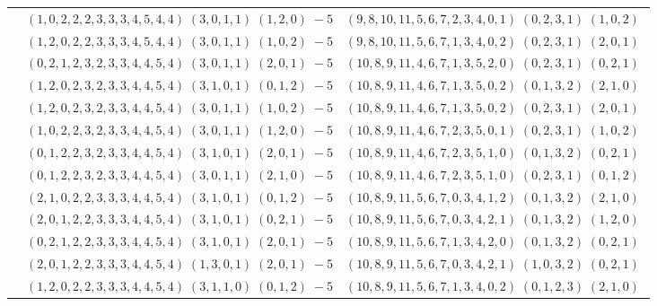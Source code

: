 \documentclass[11pt]{article}
\begin{document}
\begin{longtable}[l]{|c|c|c|}
 \cline{2-3} 
 & $(1 ,0 ,2 ,2 ,2 ,3 ,3 ,3 ,4 ,5 ,4 ,4) \;(3 ,0 ,1 ,1) \;(1 ,2 ,0) \;-5$ & $(9 ,8 ,10 ,11 ,5 ,6 ,7 ,2 ,3 ,4 ,0 ,1) \;(0 ,2 ,3 ,1) \;(1 ,0 ,2) \;$\\ 
 \cline{2-3} 
 & $(1 ,2 ,0 ,2 ,2 ,3 ,3 ,3 ,4 ,5 ,4 ,4) \;(3 ,0 ,1 ,1) \;(1 ,0 ,2) \;-5$ & $(9 ,8 ,10 ,11 ,5 ,6 ,7 ,1 ,3 ,4 ,0 ,2) \;(0 ,2 ,3 ,1) \;(2 ,0 ,1) \;$\\ 
 \cline{2-3} 
 & $(0 ,2 ,1 ,2 ,3 ,2 ,3 ,3 ,4 ,4 ,5 ,4) \;(3 ,0 ,1 ,1) \;(2 ,0 ,1) \;-5$ & $(10 ,8 ,9 ,11 ,4 ,6 ,7 ,1 ,3 ,5 ,2 ,0) \;(0 ,2 ,3 ,1) \;(0 ,2 ,1) \;$\\ 
 \cline{2-3} 
 & $(1 ,2 ,0 ,2 ,3 ,2 ,3 ,3 ,4 ,4 ,5 ,4) \;(3 ,1 ,0 ,1) \;(0 ,1 ,2) \;-5$ & $(10 ,8 ,9 ,11 ,4 ,6 ,7 ,1 ,3 ,5 ,0 ,2) \;(0 ,1 ,3 ,2) \;(2 ,1 ,0) \;$\\ 
 \cline{2-3} 
 & $(1 ,2 ,0 ,2 ,3 ,2 ,3 ,3 ,4 ,4 ,5 ,4) \;(3 ,0 ,1 ,1) \;(1 ,0 ,2) \;-5$ & $(10 ,8 ,9 ,11 ,4 ,6 ,7 ,1 ,3 ,5 ,0 ,2) \;(0 ,2 ,3 ,1) \;(2 ,0 ,1) \;$\\ 
 \cline{2-3} 
 & $(1 ,0 ,2 ,2 ,3 ,2 ,3 ,3 ,4 ,4 ,5 ,4) \;(3 ,0 ,1 ,1) \;(1 ,2 ,0) \;-5$ & $(10 ,8 ,9 ,11 ,4 ,6 ,7 ,2 ,3 ,5 ,0 ,1) \;(0 ,2 ,3 ,1) \;(1 ,0 ,2) \;$\\ 
 \cline{2-3} 
 & $(0 ,1 ,2 ,2 ,3 ,2 ,3 ,3 ,4 ,4 ,5 ,4) \;(3 ,1 ,0 ,1) \;(2 ,0 ,1) \;-5$ & $(10 ,8 ,9 ,11 ,4 ,6 ,7 ,2 ,3 ,5 ,1 ,0) \;(0 ,1 ,3 ,2) \;(0 ,2 ,1) \;$\\ 
 \cline{2-3} 
 & $(0 ,1 ,2 ,2 ,3 ,2 ,3 ,3 ,4 ,4 ,5 ,4) \;(3 ,0 ,1 ,1) \;(2 ,1 ,0) \;-5$ & $(10 ,8 ,9 ,11 ,4 ,6 ,7 ,2 ,3 ,5 ,1 ,0) \;(0 ,2 ,3 ,1) \;(0 ,1 ,2) \;$\\ 
 \cline{2-3} 
 & $(2 ,1 ,0 ,2 ,2 ,3 ,3 ,3 ,4 ,4 ,5 ,4) \;(3 ,1 ,0 ,1) \;(0 ,1 ,2) \;-5$ & $(10 ,8 ,9 ,11 ,5 ,6 ,7 ,0 ,3 ,4 ,1 ,2) \;(0 ,1 ,3 ,2) \;(2 ,1 ,0) \;$\\ 
 \cline{2-3} 
 & $(2 ,0 ,1 ,2 ,2 ,3 ,3 ,3 ,4 ,4 ,5 ,4) \;(3 ,1 ,0 ,1) \;(0 ,2 ,1) \;-5$ & $(10 ,8 ,9 ,11 ,5 ,6 ,7 ,0 ,3 ,4 ,2 ,1) \;(0 ,1 ,3 ,2) \;(1 ,2 ,0) \;$\\ 
 \cline{2-3} 
 & $(0 ,2 ,1 ,2 ,2 ,3 ,3 ,3 ,4 ,4 ,5 ,4) \;(3 ,1 ,0 ,1) \;(2 ,0 ,1) \;-5$ & $(10 ,8 ,9 ,11 ,5 ,6 ,7 ,1 ,3 ,4 ,2 ,0) \;(0 ,1 ,3 ,2) \;(0 ,2 ,1) \;$\\ 
 \cline{2-3} 
 & $(2 ,0 ,1 ,2 ,2 ,3 ,3 ,3 ,4 ,4 ,5 ,4) \;(1 ,3 ,0 ,1) \;(2 ,0 ,1) \;-5$ & $(10 ,8 ,9 ,11 ,5 ,6 ,7 ,0 ,3 ,4 ,2 ,1) \;(1 ,0 ,3 ,2) \;(0 ,2 ,1) \;$\\ 
 \cline{2-3} 
 & $(1 ,2 ,0 ,2 ,2 ,3 ,3 ,3 ,4 ,4 ,5 ,4) \;(3 ,1 ,1 ,0) \;(0 ,1 ,2) \;-5$ & $(10 ,8 ,9 ,11 ,5 ,6 ,7 ,1 ,3 ,4 ,0 ,2) \;(0 ,1 ,2 ,3) \;(2 ,1 ,0) \;$\\ 

\end{longtable}
\end{document}
